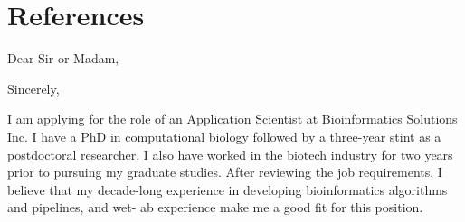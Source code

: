 \documentclass[11pt,a4paper,sans]{moderncv}        %
\renewcommand*{\bibliographyitemlabel}{[\arabic{enumiv}]}
\begin{document}
\section{References}
\begin{cvcolumns}
\end{cvcolumns}

\nocite{*}



\clearpage
\date{\today}
\opening{Dear Sir or Madam,}
\closing{Sincerely,}
\makelettertitle

I am applying for the role of an Application Scientist at Bioinformatics Solutions Inc. I have a PhD in computational biology followed by a three-year stint as a postdoctoral researcher. I also have worked in the biotech industry for two years prior to pursuing my graduate studies. After reviewing the job requirements, I believe that my decade-long experience in developing bioinformatics algorithms and pipelines, and wet- ab experience make me a good fit for this position.
 
\end{document}
